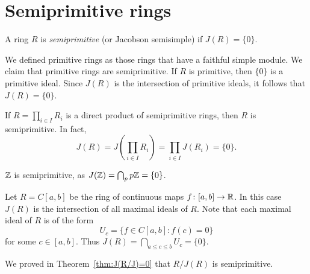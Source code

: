 
\section{Semiprimitive rings}

\begin{definition}
	A ring $R$ is \emph{semiprimitive} (or Jacobson semisimple) if  $J(R)=\{0\}$.
\end{definition}

We defined primitive rings as
those rings that have a faithful simple module.  We claim that primitive rings
are semiprimitive. If $R$ is primitive, then $\{0\}$ is a primitive ideal. Since
$J(R)$ is the intersection of primitive ideals, it follows that $J(R)=\{0\}$.

\begin{example}
	If $R=\prod_{i\in I}R_i$ is a direct product of semiprimitive rings, then
	$R$ is semiprimitive. In fact, 
	\[
		J(R)=J\left(\prod_{i\in I}R_i\right)=\prod_{i\in I}J(R_i)=\{0\}.
	\]
\end{example}

\begin{example}
$\mathbb{Z}$ is semiprimitive, as $J(\mathbb{Z})=\bigcap_{p}p\mathbb{Z}=\{0\}$.
\end{example}

\begin{example}
	\label{exa:C[a,b]}
	Let $R=C[a,b]$ be the ring of continuous maps $f\colon [a,b]\to\mathbb{R}$. 
	In this case $J(R)$ is the intersection of all maximal ideals of $R$. Note that 
	each maximal ideal of $R$ is of the form 
	\[
		U_c=\{f\in C[a,b]:f(c)=0\}
	\]
	for some $c\in[a,b]$. 
	Thus $J(R)=\bigcap_{a\leq c\leq
	b}U_c=\{0\}$.
\end{example}

We proved in Theorem~\ref{thm:J(R/J)=0} 
that $R/J(R)$ is semiprimitive. 

%
%


